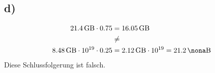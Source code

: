     \subsection*{d)}

      \begin{equation}
      	\begin{split}
      	  \SI{21.4}{\giga\byte} \cdot 0.75 & = \SI{16.05}{\giga\byte} \\
      	  & \neq \\
      	  \SI{8.48}{\giga\byte} \cdot 10^{19} \cdot 0.25 & = \SI{2.12}{\giga\byte} \cdot 10^{19} = \SI{21.2}{\nona\byte}
      	\end{split}
      \end{equation}
      \newline
      Diese Schlussfolgerung ist falsch.



